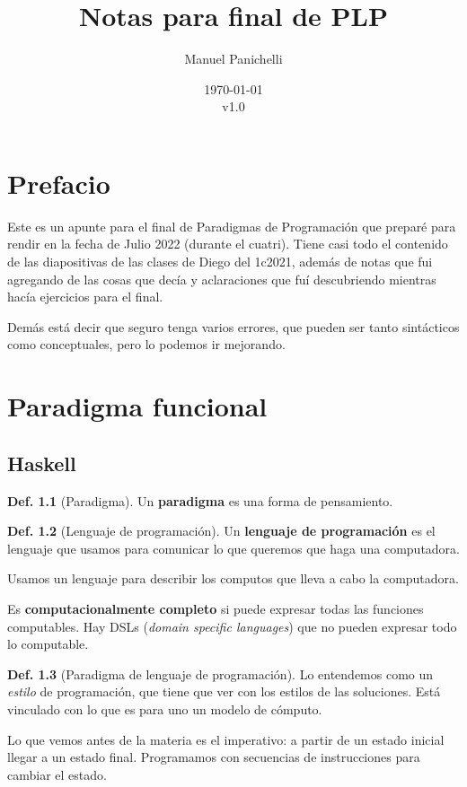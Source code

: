 \documentclass{report}
\author{Manuel Panichelli}
\title{Notas para final de PLP}
\date{\today\\v1.0}
\theoremstyle{definition} %
\newtheorem{definition}{Def.}[chapter]
\begin{document}
\maketitle

\tableofcontents

\chapter*{Prefacio}

Este es un apunte para el final de Paradigmas de Programación que preparé para
rendir en la fecha de Julio 2022 (durante el cuatri). Tiene casi todo el
contenido de las diapositivas de las clases de Diego del 1c2021, además de notas
que fui agregando de las cosas que decía y aclaraciones que fuí descubriendo
mientras hacía ejercicios para el final.

Demás está decir que seguro tenga varios errores, que pueden ser tanto
sintácticos como conceptuales, pero lo podemos ir mejorando.

\chapter{Paradigma funcional}

\section{Haskell}

\begin{definition}[Paradigma]
    Un \textbf{paradigma} es una forma de pensamiento.
\end{definition}

\begin{definition}[Lenguaje de programación]
    Un \textbf{lenguaje de programación} es el lenguaje que usamos para
    comunicar lo que queremos que haga una computadora.

    Usamos un lenguaje para describir los computos que lleva a cabo la
    computadora.
    
    Es \textbf{computacionalmente completo} si puede expresar todas las
    funciones computables. Hay DSLs (\textit{domain specific languages}) que no
    pueden expresar todo lo computable.
\end{definition}

\begin{definition}[Paradigma de lenguaje de programación]
    Lo entendemos como un \textit{estilo} de programación, que tiene que ver con
    los estilos de las soluciones. Está vinculado con lo que es para uno un
    modelo de cómputo.

    Lo que vemos antes de la materia es el imperativo: a partir de un estado
    inicial llegar a un estado final. Programamos con secuencias de
    instrucciones para cambiar el estado.
\end{definition}
\end{document}
